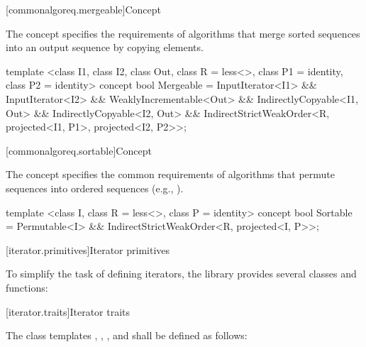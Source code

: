 [commonalgoreq.mergeable]{Concept }

\pnum
The  concept specifies the requirements of
algorithms that merge sorted sequences into an output sequence by copying elements.

%
\begin{codeblock}
  template <class I1, class I2, class Out,
      class R = less<>, class P1 = identity, class P2 = identity>
  concept bool Mergeable =
    InputIterator<I1> &&
    InputIterator<I2> &&
    WeaklyIncrementable<Out> &&
    IndirectlyCopyable<I1, Out> &&
    IndirectlyCopyable<I2, Out> &&
    IndirectStrictWeakOrder<R, projected<I1, P1>, projected<I2, P2>>;
\end{codeblock}

[commonalgoreq.sortable]{Concept }

\pnum
The  concept specifies the common requirements of algorithms that permute
sequences into ordered sequences (e.g., ).

%
\begin{codeblock}
  template <class I, class R = less<>, class P = identity>
  concept bool Sortable =
    Permutable<I> &&
    IndirectStrictWeakOrder<R, projected<I, P>>;
\end{codeblock}

[iterator.primitives]{Iterator primitives}

\pnum
To simplify the task of defining iterators, the library provides
several classes and functions:

[iterator.traits]{Iterator traits}

\pnum
The class templates ,
, ,
and  shall be defined as follows:

